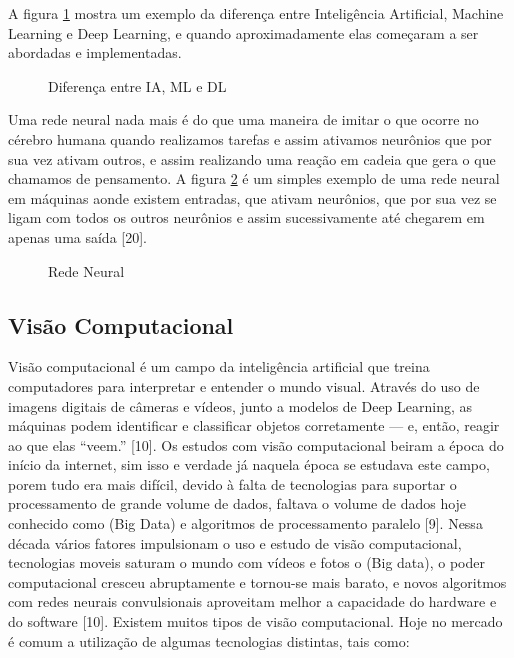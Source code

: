 A figura \ref{fig:iamldl} mostra um exemplo da diferença entre Inteligência Artificial, Machine Learning e Deep Learning, e quando aproximadamente elas começaram a ser abordadas e implementadas.

%
\begin{figure}[H]
	\centering
	\caption{Diferença entre IA, ML e DL}
	\def\svgwidth{15cm}
	
	\label{fig:iamldl}
\end{figure}

Uma rede neural nada mais é do que uma maneira de imitar o que ocorre no cérebro humana quando realizamos tarefas e assim ativamos neurônios que por sua vez ativam outros, e assim realizando uma reação em cadeia que gera o que chamamos de pensamento. A figura \ref{fig:neural} é um simples exemplo de uma rede neural em máquinas aonde existem entradas, que ativam neurônios, que por sua vez se ligam com todos os outros neurônios e assim sucessivamente até chegarem em apenas uma saída [20].

\begin{figure}[H]
	\centering
	\caption{Rede Neural}
	\def\svgwidth{15cm}
	
	\label{fig:neural}
\end{figure}

\subsection{Visão Computacional}
Visão computacional é um campo da inteligência artificial que treina computadores para interpretar e entender o mundo visual. Através do uso de imagens digitais de câmeras e vídeos, junto a modelos de Deep Learning, as máquinas podem identificar e classificar objetos corretamente — e, então, reagir ao que elas “veem.” [10].
Os estudos com visão computacional beiram a época do início da internet, sim isso e verdade já naquela época se estudava este campo, porem tudo era mais difícil, devido à falta de tecnologias para suportar o processamento de grande volume de dados, faltava o volume de dados hoje conhecido como (Big Data) e algoritmos de processamento paralelo [9]. Nessa década vários fatores impulsionam o uso e estudo de visão computacional, tecnologias moveis saturam o mundo com vídeos e fotos o (Big data), o poder computacional cresceu abruptamente e tornou-se mais barato, e novos algoritmos com redes neurais convulsionais aproveitam melhor a capacidade do hardware e do software [10].
 Existem muitos tipos de visão computacional. Hoje no mercado é comum a utilização de algumas tecnologias distintas, tais como:

